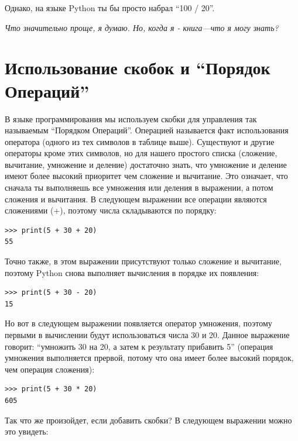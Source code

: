 Однако, на языке Python ты бы просто набрал ``100 / 20''.

\emph{Что значительно проще, я думаю.  Но, когда я - книга---что я могу знать?}

\section{Использование скобок и ``Порядок Операций''}

В языке программирования мы используем скобки для управления так называемым ``Порядком Операций''.  Операцией называется факт использования оператора (одного из тех символов в таблице выше). Существуют и другие операторы кроме этих символов, но для нашего простого списка (сложение, вычитание, умножение и деление) достаточно знать, что умножение и деление имеют более высокий приоритет чем сложение и вычитание.  Это означает, что сначала ты выполняешь все умножения или деления в выражении, а потом сложения и вычитания.  В следующем выражении все операции являются сложениями (+), поэтому числа складываются по порядку:

\begin{listing}
\begin{verbatim}
>>> print(5 + 30 + 20)
55
\end{verbatim}
\end{listing}

\noindent
Точно также, в этом выражении присутствуют только сложение и вычитание, поэтому Python снова выполняет вычисления в порядке их появления:

\begin{listing}
\begin{verbatim}
>>> print(5 + 30 - 20)
15
\end{verbatim}
\end{listing}

\noindent
Но вот в следующем выражении появляется оператор умножения, поэтому первыми в вычислении будут использоваться числа 30 и 20.  Данное выражение говорит: ``умножить 30 на 20, а затем к результату прибавить 5'' (операция умножения выполняется прервой, потому что она имеет более высокий порядок, чем операция сложения):

\begin{listing}
\begin{verbatim}
>>> print(5 + 30 * 20)
605
\end{verbatim}
\end{listing}

\noindent
Так что же произойдет, если добавить скобки? В следующем выражении можно это увидеть:

